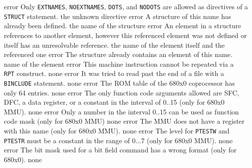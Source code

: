 \documentclass[12pt,twoside]{report}
\newcommand{\tty}[1]{{\tt #1}}
\begin{document}
\begin{description}
               {error}
               {Only \tty{EXTNAMES}, \tty{NOEXTNAMES}, \tty{DOTS},
                and \tty{NODOTS} are allowed as directives of a
                \tty{STRUCT} statement.}
               {the unknown directive}
               {error}
               {A structure of this name has already been defined.}
               {the name of the structure}
               {error}
               {An element in a structure references to another
                element, however this referenced element was not
                defined or itself has an unresolvable reference.}
               {the name of the element itself and the referenced one}
               {error}
               {The structure already contains an element of this name.}
               {name of the element}
               {error}
               {This machine instruction cannot be repeated via a {\tt
                RPT} construct.}
               {none}
               {error}
               {It was tried to read past the end of a file with a
                \tty{BINCLUDE} statement.}
               {none}
               {error}
               {The ROM table of the 680x0 coprocessor has only 64 entries.}
               {none}
               {error}
               {The only function code arguments allowed are SFC, DFC, a
                data register, or a constant in the interval of 0..15 (only
                for 680x0 MMU).}
               {none}
               {error}
               {Only a number in the interval 0..15 can be used as
                function code mask (only for 680x0 MMU)}
               {none}
               {error}
               {The MMU does not have a register with this name (only for
                680x0 MMU).}
               {none}
               {error}
               {The level for \tty{PTESTW} and \tty{PTESTR} must be a constant in the
                range of 0...7 (only for 680x0 MMU).}
               {none}
               {error}
               {The bit mask used for a bit field command has a wrong
                format (only for 680x0).}
               {none}

\end{description}
\end{document}

